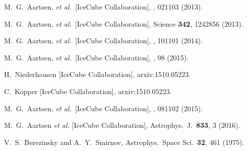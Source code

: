\documentclass[aps,prd,nofootinbib,twocolumn,floatfix,letterpaper,superscriptaddress,showpacs]{revtex4}
\begin{document}
\begin{thebibliography}{99}
  M.~G.~Aartsen, {\it et al.}\ [IceCube Collaboration],
  , 021103 (2013).

  M.~G.~Aartsen, {\it et al.}\ [IceCube Collaboration],
  Science {\bf 342}, 1242856 (2013).

  M.~G.~Aartsen, {\it et al.}\ [IceCube Collaboration],
  , 101101 (2014).

  M.~G.~Aartsen, {\it et al.}\ [IceCube Collaboration],
  , 98 (2015).

  H.~Niederhausen [IceCube Collaboration],
  arxiv:1510.05223.

  C.~Kopper [IceCube Collaboration],
  arxiv:1510.05223.

  M.~G.~Aartsen, {\it et al.}\ [IceCube Collaboration],
  , 081102 (2015).

  M.~G.~Aartsen {\it et al.} [IceCube Collaboration],
  Astrophys.\ J.\  {\bf 833}, 3 (2016).


  V.~S.~Berezinsky and A.~Y.~Smirnov,
  Astrophys.\ Space Sci.\  {\bf 32}, 461 (1975).


\end{thebibliography}
\end{document}
